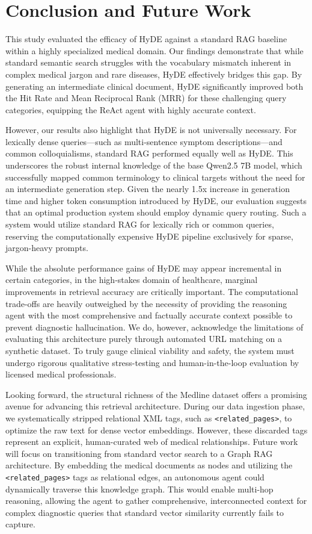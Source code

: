 \section{Conclusion and Future Work}
\label{sec:conclusion}

This study evaluated the efficacy of HyDE against a standard RAG baseline within a highly specialized medical domain. Our findings demonstrate that while standard semantic search struggles with the vocabulary mismatch inherent in complex medical jargon and rare diseases, HyDE effectively bridges this gap. By generating an intermediate clinical document, HyDE significantly improved both the Hit Rate and Mean Reciprocal Rank (MRR) for these challenging query categories, equipping the ReAct agent with highly accurate context.

However, our results also highlight that HyDE is not universally necessary. For lexically dense queries---such as multi-sentence symptom descriptions---and common colloquialisms, standard RAG performed equally well as HyDE. This underscores the robust internal knowledge of the base Qwen2.5 7B model, which successfully mapped common terminology to clinical targets without the need for an intermediate generation step. Given the nearly 1.5x increase in generation time and higher token consumption introduced by HyDE, our evaluation suggests that an optimal production system should employ dynamic query routing. Such a system would utilize standard RAG for lexically rich or common queries, reserving the computationally expensive HyDE pipeline exclusively for sparse, jargon-heavy prompts.

While the absolute performance gains of HyDE may appear incremental in certain categories, in the high-stakes domain of healthcare, marginal improvements in retrieval accuracy are critically important. The computational trade-offs are heavily outweighed by the necessity of providing the reasoning agent with the most comprehensive and factually accurate context possible to prevent diagnostic hallucination. We do, however, acknowledge the limitations of evaluating this architecture purely through automated URL matching on a synthetic dataset. To truly gauge clinical viability and safety, the system must undergo rigorous qualitative stress-testing and human-in-the-loop evaluation by licensed medical professionals.

Looking forward, the structural richness of the Medline dataset offers a promising avenue for advancing this retrieval architecture. During our data ingestion phase, we systematically stripped relational XML tags, such as \texttt{<related\_pages>}, to optimize the raw text for dense vector embeddings. However, these discarded tags represent an explicit, human-curated web of medical relationships. Future work will focus on transitioning from standard vector search to a Graph RAG architecture. By embedding the medical documents as nodes and utilizing the \texttt{<related\_pages>} tags as relational edges, an autonomous agent could dynamically traverse this knowledge graph. This would enable multi-hop reasoning, allowing the agent to gather comprehensive, interconnected context for complex diagnostic queries that standard vector similarity currently fails to capture.